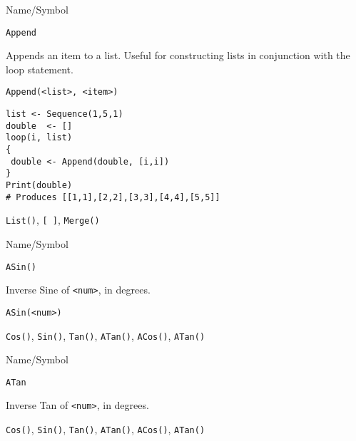 \rl


\begin{desc}{Name/Symbol}

\item[Name/Symbol]  	\verb+Append+
  
\item[Description]  	Appends an item to a list.  Useful for constructing lists in conjunction with the loop statement.

\item[Usage] 
\begin{verbatim}
Append(<list>, <item>)
\end{verbatim}

\item[Example]
\begin{verbatim}
list <- Sequence(1,5,1)
double  <- []
loop(i, list)
{
 double <- Append(double, [i,i])
}
Print(double)
# Produces [[1,1],[2,2],[3,3],[4,4],[5,5]]
\end{verbatim}

\item[See Also]     	\verb+List()+, \verb+[ ]+, \verb+Merge()+
\end{desc}

\rl



\begin{desc}{Name/Symbol}

\item[Name/Symbol]  	\verb+ASin()+ 

\item[Description]  	Inverse Sine of \verb+<num>+, in degrees.

\item[Usage]
\begin{verbatim}
ASin(<num>)
\end{verbatim}

\item[Example]	

\item[See Also]    	 \verb+Cos()+, \verb+Sin()+, \verb+Tan()+, \verb+ATan()+, \verb+ACos()+, \verb+ATan()+ 
\end{desc}

\rl



\begin{desc}{Name/Symbol}

\item[Name/Symbol]  	\verb+ATan+ 

\item[Description]  	Inverse Tan of \verb+<num>+, in degrees.

\item[Usage]		

\item[Example]	

\item[See Also]    	\verb+Cos()+, \verb+Sin()+, \verb+Tan()+, \verb+ATan()+, \verb+ACos()+, \verb+ATan()+ 
\end{desc}


